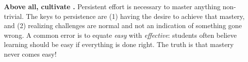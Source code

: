 \vskip 10pt

\noindent
{\bf Above all, cultivate .}  Persistent effort is necessary to master anything non-trivial.  The keys to persistence are (1) having the desire to achieve that mastery, and (2) realizing challenges are normal and not an indication of something gone wrong.  A common error is to equate {\it easy} with {\it effective}: students often believe learning should be easy if everything is done right.  The truth is that mastery never comes easy!

\vfil 

\eject






